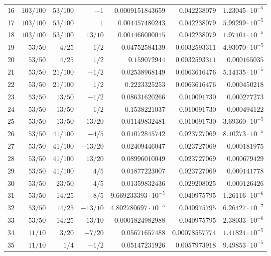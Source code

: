 \documentclass[11pt,reqno]{amsart}
\numberwithin{equation}{section}
\theoremstyle{definition}
\theoremstyle{remark}
\begin{document}
\begin{center}
\begin{longtable}{@{}rrrrrrr@{}}
16 & $103/100$ & $53/100$ & $-1$ & $0.0009151843659$ & $0.042238079$ & $1.23045\cdot10^{-5}$\\
17 & $103/100$ & $53/100$ & $1$ & $0.004457480243$ & $0.042238079$ & $5.99299\cdot10^{-5}$\\
18 & $103/100$ & $53/100$ & $13/10$ & $0.001466000015$ & $0.042238079$ & $1.97101\cdot10^{-5}$\\
19 & $53/50$ & $4/25$ & $-1/2$ & $0.04752584139$ & $0.0032593311$ & $4.93070\cdot10^{-5}$\\
20 & $53/50$ & $4/25$ & $1/2$ & $0.159072944$ & $0.0032593311$ & $0.000165035$\\
21 & $53/50$ & $21/100$ & $-1/2$ & $0.02538968149$ & $0.0063616476$ & $5.14135\cdot10^{-5}$\\
22 & $53/50$ & $21/100$ & $1/2$ & $0.2223325253$ & $0.0063616476$ & $0.000450218$\\
23 & $53/50$ & $13/50$ & $-1/2$ & $0.08631620266$ & $0.010091730$ & $0.000277273$\\
24 & $53/50$ & $13/50$ & $1/2$ & $0.1538221037$ & $0.010091730$ & $0.000494122$\\
25 & $53/50$ & $13/50$ & $13/20$ & $0.01149832481$ & $0.010091730$ & $3.69360\cdot10^{-5}$\\
26 & $53/50$ & $41/100$ & $-4/5$ & $0.01072845742$ & $0.023727069$ & $8.10273\cdot10^{-5}$\\
27 & $53/50$ & $41/100$ & $-13/20$ & $0.02409446047$ & $0.023727069$ & $0.000181975$\\
28 & $53/50$ & $41/100$ & $13/20$ & $0.08996010049$ & $0.023727069$ & $0.000679429$\\
29 & $53/50$ & $41/100$ & $4/5$ & $0.01877223007$ & $0.023727069$ & $0.000141778$\\
30 & $53/50$ & $23/50$ & $4/5$ & $0.01359832436$ & $0.029208025$ & $0.000126426$\\
31 & $53/50$ & $14/25$ & $-8/5$ & $9.669233393\cdot10^{-5}$ & $0.040975795$ & $1.26116\cdot10^{-6}$\\
32 & $53/50$ & $14/25$ & $-13/10$ & $4.802780697\cdot10^{-5}$ & $0.040975795$ & $6.26427\cdot10^{-7}$\\
33 & $53/50$ & $14/25$ & $13/10$ & $0.0001824982988$ & $0.040975795$ & $2.38033\cdot10^{-6}$\\
34 & $11/10$ & $3/20$ & $-7/20$ & $0.05671657488$ & $0.00078557774$ & $1.41824\cdot10^{-5}$\\
35 & $11/10$ & $1/4$ & $-1/2$ & $0.05147231926$ & $0.0057973918$ & $9.49853\cdot10^{-5}$\\

\end{longtable}
\end{center}
\end{document}
